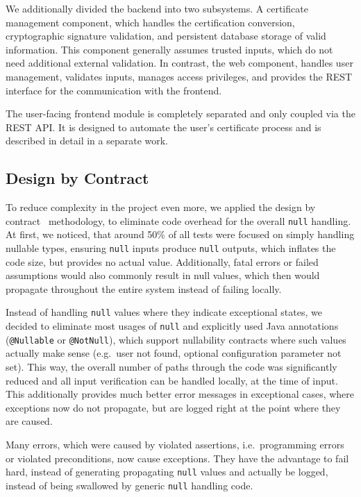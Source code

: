 We additionally divided the backend into two subsystems.
A certificate management component, which handles the certification conversion, cryptographic signature validation, and
persistent database storage of valid information.
This component generally assumes trusted inputs, which do not need additional external validation.
In contrast, the web component, handles user management, validates inputs, manages access privileges, and provides the
REST interface for the communication with the frontend.

The user-facing frontend module is completely separated and only coupled via the REST API\@.
It is designed to automate the user's certificate process and is described in detail in a separate work.
\subsection*{Design by Contract}
To reduce complexity in the project even more, we applied the design by contract~\cite{meyer1992applying} methodology,
to eliminate code overhead for the overall \lstinline{null} handling.
At first, we noticed, that around 50\% of all tests were focused on simply handling nullable types, ensuring
\lstinline{null} inputs produce \lstinline{null} outputs, which inflates the code size, but provides no actual value.
Additionally, fatal errors or failed assumptions would also commonly result in null values, which then would propagate
throughout the entire system instead of failing locally.

Instead of handling \lstinline{null} values where they indicate exceptional states, we decided to eliminate most usages
of \lstinline{null} and explicitly used Java annotations (\lstinline{@Nullable} or \lstinline{@NotNull}), which support
nullability contracts where such values actually make sense (e.g.\ user not found, optional configuration parameter not
set).
This way, the overall number of paths through the code was significantly reduced and all input verification can be
handled locally, at the time of input.
This additionally provides much better error messages in exceptional cases, where exceptions now do not propagate, but
are logged right at the point where they are caused.

Many errors, which were caused by violated assertions, i.e.\ programming errors or violated preconditions, now cause
exceptions.
They have the advantage to fail hard, instead of generating propagating \lstinline{null} values and actually be logged,
instead of being swallowed by generic \lstinline{null} handling code.

